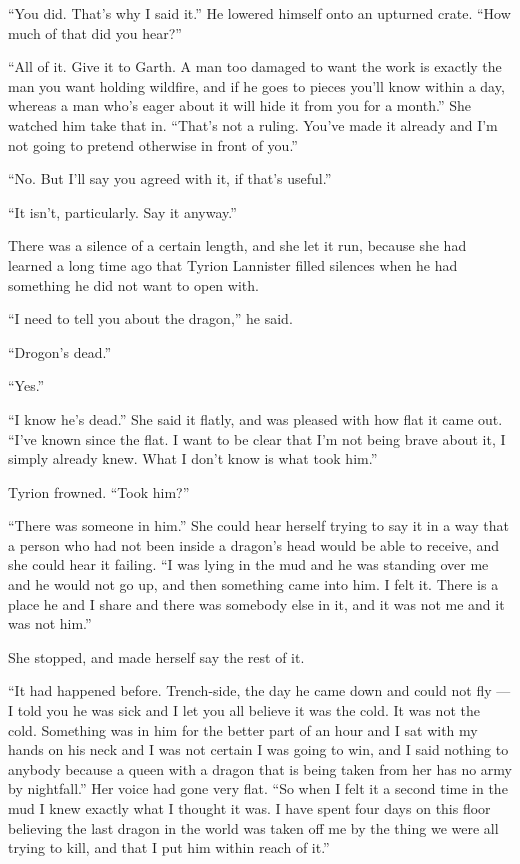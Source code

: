 “You did. That’s why I said it.” He lowered himself onto an upturned crate. “How much of that did you hear?”

“All of it. Give it to Garth. A man too damaged to want the work is exactly the man you want holding wildfire, and if he goes to pieces you’ll know within a day, whereas a man who’s eager about it will hide it from you for a month.” She watched him take that in. “That’s not a ruling. You’ve made it already and I’m not going to pretend otherwise in front of you.”

“No. But I’ll say you agreed with it, if that’s useful.”

“It isn’t, particularly. Say it anyway.”

There was a silence of a certain length, and she let it run, because she had learned a long time ago that Tyrion Lannister filled silences when he had something he did not want to open with.

“I need to tell you about the dragon,” he said.

“Drogon’s dead.”

“Yes.”

“I know he’s dead.” She said it flatly, and was pleased with how flat it came out. “I’ve known since the flat. I want to be clear that I’m not being brave about it, I simply already knew. What I don’t know is what took him.”

Tyrion frowned. “Took him?”

“There was someone in him.” She could hear herself trying to say it in a way that a person who had not been inside a dragon’s head would be able to receive, and she could hear it failing. “I was lying in the mud and he was standing over me and he would not go up, and then something came into him. I felt it. There is a place he and I share and there was somebody else in it, and it was not me and it was not him.”

She stopped, and made herself say the rest of it.

“It had happened before. Trench-side, the day he came down and could not fly — I told you he was sick and I let you all believe it was the cold. It was not the cold. Something was in him for the better part of an hour and I sat with my hands on his neck and I was not certain I was going to win, and I said nothing to anybody because a queen with a dragon that is being taken from her has no army by nightfall.” Her voice had gone very flat. “So when I felt it a second time in the mud I knew exactly what I thought it was. I have spent four days on this floor believing the last dragon in the world was taken off me by the thing we were all trying to kill, and that I put him within reach of it.”

